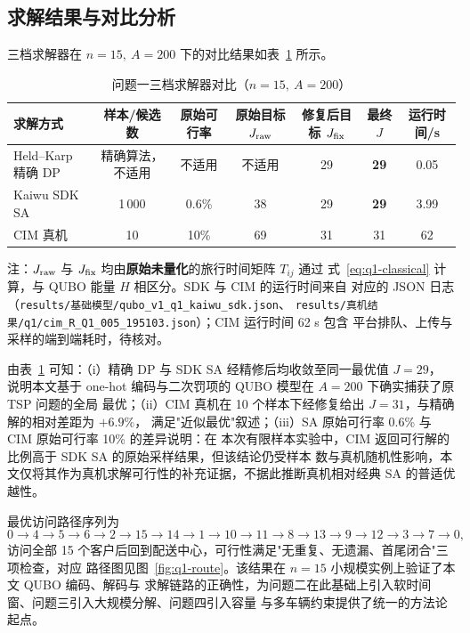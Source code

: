 \documentclass[UTF8,12pt,a4paper]{ctexart}
\begin{document}
\subsection{求解结果与对比分析}
\label{subsec:q1-result}

三档求解器在 $n=15,\ A=200$ 下的对比结果如表~\ref{tab:q1-cmp} 所示。

\begin{table}[H]
  \centering
  \caption{问题一三档求解器对比（$n=15,\ A=200$）}
  \label{tab:q1-cmp}
  \footnotesize
  \begin{tabular}{lcccccc}
    \toprule
    求解方式 & 样本/候选数 & 原始可行率 & 原始目标 $J_{\rm raw}$ & 修复后目标 $J_{\rm fix}$ & 最终 $J$ & 运行时间/s \\
    \midrule
    Held--Karp 精确 DP & 精确算法，不适用 & 不适用 & 不适用 & 29 & \textbf{29} & 0.05 \\
    Kaiwu SDK SA      & 1\,000 & 0.6\% & 38 & 29 & \textbf{29} & 3.99 \\
    CIM 真机          & 10    & 10\%  & 69 & 31 & 31         & 62 \\
    \bottomrule
  \end{tabular}
  \begin{flushleft}\footnotesize
  注：$J_{\rm raw}$ 与 $J_{\rm fix}$ 均由\textbf{原始未量化}的旅行时间矩阵 $T_{ij}$ 通过
  式~\eqref{eq:q1-classical} 计算，与 QUBO 能量 $H$ 相区分。SDK 与 CIM 的运行时间来自
  对应的 JSON 日志（\texttt{results/基础模型/qubo\_v1\_q1\_kaiwu\_sdk.json}、
  \texttt{results/真机结果/q1/cim\_R\_Q1\_005\_195103.json}）；CIM 运行时间 62 s 包含
  平台排队、上传与采样的端到端耗时，待核对。
  \end{flushleft}
\end{table}

由表~\ref{tab:q1-cmp} 可知：（i）精确 DP 与 SDK SA 经精修后均收敛至同一最优值 $J=29$，
说明本文基于 one-hot 编码与二次罚项的 QUBO 模型在 $A=200$ 下确实捕获了原 TSP 问题的全局
最优；（ii）CIM 真机在 10 个样本下经修复给出 $J=31$，与精确解的相对差距为 $+6.9\%$，
满足"近似最优"叙述；（iii）SA 原始可行率 0.6\% 与 CIM 原始可行率 10\% 的差异说明：在
本次有限样本实验中，CIM 返回可行解的比例高于 SDK SA 的原始采样结果，但该结论仍受样本
数与真机随机性影响，本文仅将其作为真机求解可行性的补充证据，不据此推断真机相对经典
SA 的普适优越性。

最优访问路径序列为
\begin{equation}
\label{eq:q1-route}
0 \to 4 \to 5 \to 6 \to 2 \to 15 \to 14 \to 1 \to 10 \to 11 \to 8 \to 13 \to 9 \to 12 \to 3 \to 7 \to 0,
\end{equation}
访问全部 15 个客户后回到配送中心，可行性满足"无重复、无遗漏、首尾闭合"三项检查，对应
路径图见图~\ref{fig:q1-route}。该结果在 $n=15$ 小规模实例上验证了本文 QUBO 编码、解码与
求解链路的正确性，为问题二在此基础上引入软时间窗、问题三引入大规模分解、问题四引入容量
与多车辆约束提供了统一的方法论起点。
\end{document}
